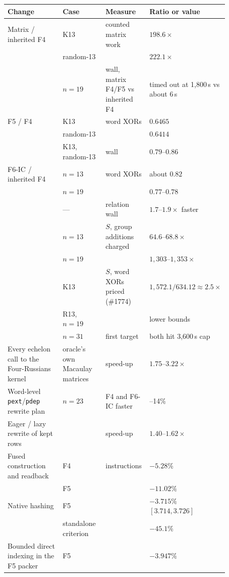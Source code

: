\begin{table}[p]
\centering\scriptsize
\begin{tabular}{@{}>{\raggedright\arraybackslash}p{0.27\linewidth}>{\raggedright\arraybackslash}p{0.2\linewidth}>{\raggedright\arraybackslash}p{0.2\linewidth}>{\raggedleft\arraybackslash}p{0.2\linewidth}@{}}
\toprule
Change & Case & Measure & Ratio or value \\
\midrule
Matrix / inherited F4 & K13 & counted matrix work & $198.6\times$ \\
 & random-13 & & $222.1\times$ \\
 & $n=19$ & wall, matrix F4/F5 vs inherited F4 & timed out at 1{,}800\,s vs about 6\,s \\
\addlinespace
F5 / F4 & K13 & word XORs & $0.6465$ \\
 & random-13 & & $0.6414$ \\
 & K13, random-13 & wall & $0.79$--$0.86$ \\
\addlinespace
F6-IC / inherited F4 & $n=13$ & word XORs & about $0.82$ \\
 & $n=19$ & & $0.77$--$0.78$ \\
 & --- & relation wall & $1.7$--$1.9\times$ faster \\
 & $n=13$ & $S$, group additions charged & $64.6$--$68.8\times$ \\
 & $n=19$ & & $1{,}303$--$1{,}353\times$ \\
 & K13 & $S$, word XORs priced (\#1774) & $1{,}572.1/634.12\approx2.5\times$ \\
 & R13, $n=19$ & & lower bounds \\
 & $n=31$ & first target & both hit 3{,}600\,s cap \\
\addlinespace
Every echelon call to the Four-Russians kernel & oracle's own Macaulay matrices & speed-up & $1.75$--$3.22\times$ \\
Word-level \texttt{pext}/\texttt{pdep} rewrite plan & $n=23$ & F4 and F6-IC faster & 10--14\% \\
Eager / lazy rewrite of kept rows & & speed-up & $1.40$--$1.62\times$ \\
\addlinespace
Fused construction and readback & F4 & instructions & $-5.28\%$ \\
 & F5 & & $-11.02\%$ \\
Native hashing & F5 & & $-3.715\%$ $[3.714,3.726]$ \\
 & standalone criterion & & $-45.1\%$ \\
Bounded direct indexing in the F5 packer & F5 & & $-3.947\%$ \\

\end{tabular}
\end{table}
